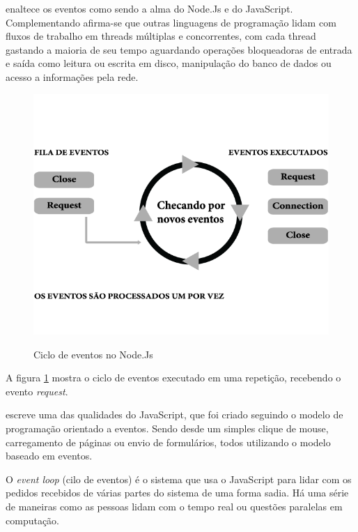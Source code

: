   \cite{Wilson:2013} enaltece os eventos como sendo a alma do Node.Js e do JavaScript. 
  Complementando afirma-se que outras linguagens de programação lidam com fluxos de trabalho em threads múltiplas 
  e concorrentes, com cada thread gastando a maioria de seu tempo aguardando operações bloqueadoras de entrada e 
  saída como leitura ou escrita em disco, manipulação do banco de dados ou acesso a informações pela rede.
  
  \begin{figure}[H]
  \setlength{\abovecaptionskip}{0pt}
  \setlength{\belowcaptionskip}{0pt}
  \caption[Ciclo de eventos no Node.Js]{Ciclo de eventos no Node.Js}
  \centering
  \includegraphics[width=.85\textwidth]{imagem/event-loop-caio-ribeiro.png}
  \captionsetup{justification=centering}
  \label{fig:event-loop}
  \end{figure}
  
  A figura \ref{fig:event-loop} mostra o ciclo de eventos executado em uma repetição, recebendo o evento \textit{request}.
  
  \cite{Wilson:2013} escreve uma das qualidades do JavaScript, que foi criado seguindo o modelo de programação orientado 
  a eventos. Sendo desde um simples clique de mouse, carregamento de páginas ou envio de formulários, todos utilizando 
  o modelo baseado em eventos.
  
  O \textit{event loop} (cilo de eventos) é o sistema que usa o JavaScript para lidar com os pedidos recebidos de várias
  partes do sistema de uma forma sadia. Há uma série de maneiras como as pessoas lidam com o tempo real ou questões 
  paralelas em computação. 


